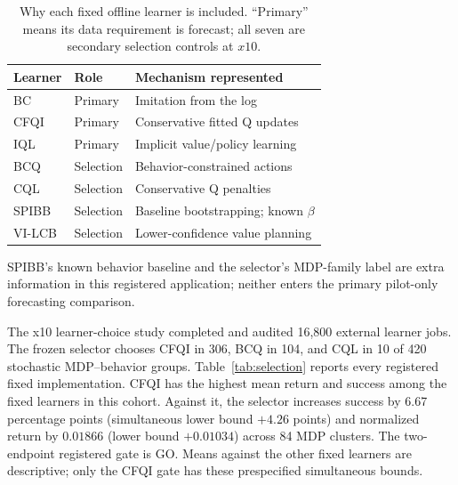 \begin{table}[t]
\centering\footnotesize
\caption{Why each fixed offline learner is included. ``Primary'' means its data requirement is forecast; all seven are secondary selection controls at $x10$.}
\label{tab:learner-roles}
\begin{tabular}{@{}llp{}@{}}
\toprule
Learner & Role & Mechanism represented\\
\midrule
BC & Primary & Imitation from the log\\
CFQI & Primary & Conservative fitted Q updates\\
IQL & Primary & Implicit value/policy learning\\
BCQ & Selection & Behavior-constrained actions\\
CQL & Selection & Conservative Q penalties\\
SPIBB & Selection & Baseline bootstrapping; known $\beta$\\
VI-LCB & Selection & Lower-confidence value planning\\
\bottomrule
\end{tabular}
\end{table}

SPIBB's known behavior baseline and the selector's MDP-family label are extra information in this registered application; neither enters the primary pilot-only forecasting comparison.

The x10 learner-choice study completed and audited 16,800 external learner jobs. The frozen selector chooses CFQI in 306, BCQ in 104, and CQL in 10 of 420 stochastic MDP--behavior groups. Table~\ref{tab:selection} reports every registered fixed implementation. CFQI has the highest mean return and success among the fixed learners in this cohort. Against it, the selector increases success by 6.67 percentage points (simultaneous lower bound $+4.26$ points) and normalized return by $0.01866$ (lower bound $+0.01034$) across 84 MDP clusters. The two-endpoint registered gate is GO. Means against the other fixed learners are descriptive; only the CFQI gate has these prespecified simultaneous bounds.

